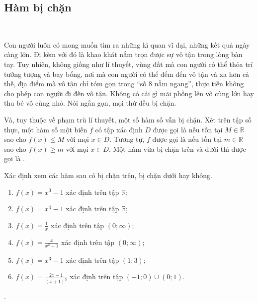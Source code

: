 \subsection{Hàm bị chặn}

\ %

Con người luôn có mong muốn tìm ra những kì quan vĩ đại, những kết quả ngày càng lớn. Đi kèm với đó là khao khát nắm trọn được sự vô tận trong lòng bàn tay. Tuy nhiên, không giống như lí thuyết, vùng đất mà con người có thể thỏa trí tưởng tượng và bay bổng, nơi mà con người có thể đếm đến vô tận và xa hơn cả thế, địa điểm mà vô tận chỉ tóm gọn trong ``số $8$ nằm ngang'', thực tiễn không cho phép con người đi đến vô tận. Không có cái gì mãi phồng lên vô cùng lớn hay thu bé vô cùng nhỏ. Nói ngắn gọn, mọi thứ đều bị chặn.

Và, tuy thuộc về phạm trù lí thuyết, một số hàm số vẫn bị chặn. Xét trên tập số thực, một hàm số một biến $f$ có tập xác định $D$ được gọi là  nếu tồn tại $M \in \mathbb{R}$ sao cho $f(x) \leq M$ với mọi $x \in D$. Tương tự, $f$ được gọi là  nếu tồn tại $m \in \mathbb{R}$ sao cho $f(x) \geq m$ với mọi $x \in D$. Một hàm vừa bị chặn trên và dưới thì được gọi là .

\exercise Xác định xem các hàm sau có bị chặn trên, bị chặn dưới hay không.

\begin{multicols}{2}
   \begin{enumerate}
      \item $f(x) = x^3 - 1$ xác định trên tập $\mathbb{R}$;
      \item $f(x) = x^4 - 1$ xác định trên tập $\mathbb{R}$;
      \item $f(x) = \frac{1}{x}$ xác định trên tập $\left(0; \infty\right)$;
      \item $f(x) = \frac{x}{x^2 + 1}$ xác định trên tập $\left(0; \infty\right)$;
      \item $f(x) = x^3 - 1$ xác định trên tập $\left(1; 3\right)$;
      \item $f(x) = \frac{2x - 1}{(x + 1)^3}$ xác định trên tập $\left(-1; 0\right) \cup \left(0; 1\right)$.
   \end{enumerate}
\end{multicols}

\solution

\setcounter{subexercise}{1}
. 


